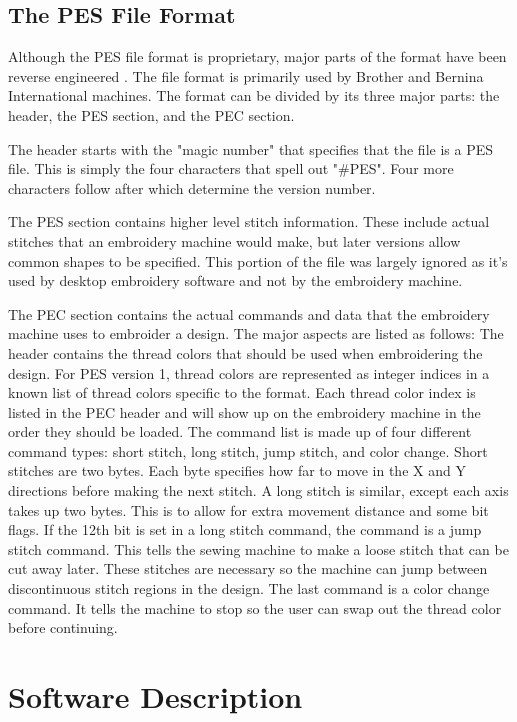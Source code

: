 \documentclass{article}
\begin{document}
\subsection{The PES File Format}

Although the PES file format is proprietary, major parts of the format have been reverse engineered \cite{PESFormat}. The file format is primarily used by Brother and Bernina International machines. The format can be divided by its three major parts: the header, the PES section, and the PEC section.

The header starts with the "magic number" that specifies that the file is a PES file. This is simply the four characters that spell out "\#PES". Four more characters follow after which determine the version number.

The PES section contains higher level stitch information. These include actual stitches that an embroidery machine would make, but later versions allow common shapes to be specified. This portion of the file was largely ignored as it's used by desktop embroidery software and not by the embroidery machine.

The PEC section contains the actual commands and data that the embroidery machine uses to embroider a design. The major aspects are listed as follows: The header contains the thread colors that should be used when embroidering the design. For PES version 1, thread colors are represented as integer indices in a known list of thread colors specific to the format. Each thread color index is listed in the PEC header and will show up on the embroidery machine in the order they should be loaded. The command list is made up of four different command types: short stitch, long stitch, jump stitch, and color change. Short stitches are two bytes. Each byte specifies how far to move in the X and Y directions before making the next stitch. A long stitch is similar, except each axis takes up two bytes. This is to allow for extra movement distance and some bit flags. If the 12th bit is set in a long stitch command, the command is a jump stitch command. This tells the sewing machine to make a loose stitch that can be cut away later. These stitches are necessary so the machine can jump between discontinuous stitch regions in the design. The last command is a color change command. It tells the machine to stop so the user can swap out the thread color before continuing.

\section{Software Description}
\end{document}
